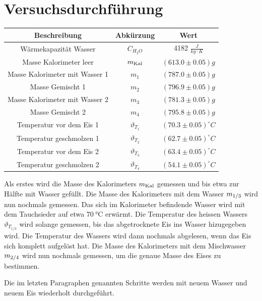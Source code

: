 \documentclass[a4paper,12pt]{article}
\begin{document}
\section{Versuchsdurchführung}
\begin{table}[H]
    \centering
    \begin{tabular}{|c|c|c|}
        \hline
        \textbf{Beschreibung} & \textbf{Abkürzung} & \textbf{Wert} \\
        \hline
        Wärmekapazität Wasser & $C_{H_{2}O}$ & 4182 $\frac{J}{kg\cdot{}K}$\\
        \hline
        Masse Kalorimeter leer & ${m_{\rm{Kal}}}$ & $(613.0\pm 0.05)g$\\
        Masse Kalorimeter mit Wasser 1 & $m_{1}$ & $(787.0\pm 0.05)g$\\
        \hline
        Masse Gemischt 1 & $m_{2}$ & $(796.9\pm 0.05)g$\\
        Masse Kalorimeter mit Wasser 2 & $m_{3}$ & $(781.3\pm 0.05)g$\\
    Masse Gemischt 2 & $m_{4}$ & $(795.8\pm 0.05)g$\\
        \hline
        Temperatur vor dem Eis 1 & $\vartheta_{T_{1}}$ & $(70.3\pm 0.05)^{\circ}C$\\
        Temperatur geschmolzen 1 & $\vartheta_{T_{2}}$ & $(62.7\pm 0.05) ^{\circ}C$\\
        \hline
        Temperatur vor dem Eis 2 & $\vartheta_{T_{3}}$ & $(63.4\pm 0.05)^{\circ}C$\\
        Temperatur geschmolzen 2 & $\vartheta_{T_{4}}$ & $(54.1\pm 0.05) ^{\circ}C$\\
        \hline
    \end{tabular}
\end{table}
Als erstes wird die Masse des Kalorimeters $m_{\rm{Kal}} $ gemessen  und bis etwa zur Hälfte mit Wasser gefüllt. Die Masse des Kalorimeters mit dem Wasser $m_{\rm{1/3}} $ wird nun nochmals gemessen. Das sich im Kalorimeter befindende Wasser wird mit dem Tauchsieder auf etwa  $\SI{70}{\celsius}$ erwärmt. Die Temperatur des heissen Wassers $\vartheta_{T_{1/3}}$ wird solange gemessen, bis das abgetrocknete Eis ins Wasser hizugegeben wird. Die Temperatur des Wassers wird dann nochmals abgelesen, wenn das Eis sich komplett aufgelöst hat. Die Masse des Kalorimeters mit dem Mischwasser $m_{\rm{2/4}} $ wird nun nochmals gemessen, um die genaue Masse des Eises zu bestimmen.

Die im letzten Paragraphen genannten Schritte werden mit neuem Wasser und neuem Eis wiederholt durchgeführt.
\end{document}
